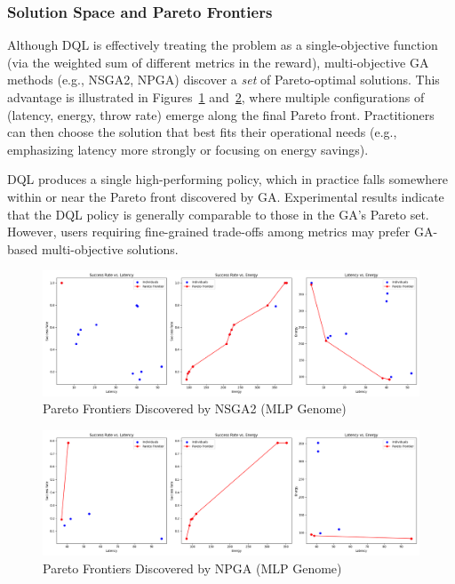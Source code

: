 \documentclass[preprint,3p,authoryear]{elsarticle}
\begin{document}
\subsubsection{Solution Space and Pareto Frontiers}
Although DQL is effectively treating the problem as a single-objective function (via the weighted sum of different metrics in the reward), multi-objective GA methods (e.g., NSGA2, NPGA) discover a \emph{set} of Pareto-optimal solutions. This advantage is illustrated in Figures~\ref{fig:nsga2-pareto-frontiers} and~\ref{fig:npga-pareto-frontiers}, where multiple configurations of (latency, energy, throw rate) emerge along the final Pareto front. Practitioners can then choose the solution that best fits their operational needs (e.g., emphasizing latency more strongly or focusing on energy savings).

DQL produces a single high-performing policy, which in practice falls somewhere within or near the Pareto front discovered by GA. Experimental results indicate that the DQL policy is generally comparable to those in the GA’s Pareto set. However, users requiring fine-grained trade-offs among metrics may prefer GA-based multi-objective solutions.

\begin{figure}[H]
    \centering
    \includegraphics[width=0.9\linewidth]{figs/pareto_frontiers_nsga2.png}
    \caption{Pareto Frontiers Discovered by NSGA2 (MLP Genome)}
    \label{fig:nsga2-pareto-frontiers}
\end{figure}

\begin{figure}[H]
    \centering
    \includegraphics[width=0.9\linewidth]{figs/pareto_frontiers_npga.png}
    \caption{Pareto Frontiers Discovered by NPGA (MLP Genome)}
    \label{fig:npga-pareto-frontiers}
\end{figure}
\end{document}
